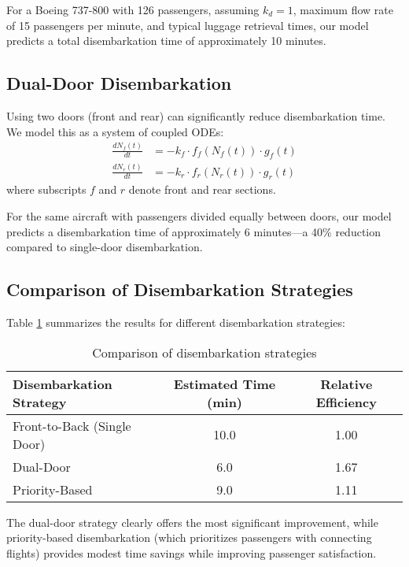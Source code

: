 \documentclass[12pt,a4paper]{article}
\begin{document}
For a Boeing 737-800 with 126 passengers, assuming $k_d = 1$, maximum flow rate of 15 passengers per minute, and typical luggage retrieval times, our model predicts a total disembarkation time of approximately 10 minutes.

\subsection{Dual-Door Disembarkation}
Using two doors (front and rear) can significantly reduce disembarkation time. We model this as a system of coupled ODEs:
\begin{align}
\frac{dN_f(t)}{dt} &= -k_f \cdot f_f(N_f(t)) \cdot g_f(t) \\
\frac{dN_r(t)}{dt} &= -k_r \cdot f_r(N_r(t)) \cdot g_r(t)
\label{eq:dual_door}
\end{align}
where subscripts $f$ and $r$ denote front and rear sections.

For the same aircraft with passengers divided equally between doors, our model predicts a disembarkation time of approximately 6 minutes—a 40\% reduction compared to single-door disembarkation.

\subsection{Comparison of Disembarkation Strategies}
Table \ref{tab:disembarkation_comparison} summarizes the results for different disembarkation strategies:

\begin{table}[H]
\centering
\begin{tabular}{|l|c|c|}
\hline
\textbf{Disembarkation Strategy} & \textbf{Estimated Time (min)} & \textbf{Relative Efficiency} \\ \hline
Front-to-Back (Single Door) & 10.0 & 1.00 \\ \hline
Dual-Door & 6.0 & 1.67 \\ \hline
Priority-Based & 9.0 & 1.11 \\ \hline
\end{tabular}
\caption{Comparison of disembarkation strategies}
\label{tab:disembarkation_comparison}
\end{table}

The dual-door strategy clearly offers the most significant improvement, while priority-based disembarkation (which prioritizes passengers with connecting flights) provides modest time savings while improving passenger satisfaction.
\end{document}
